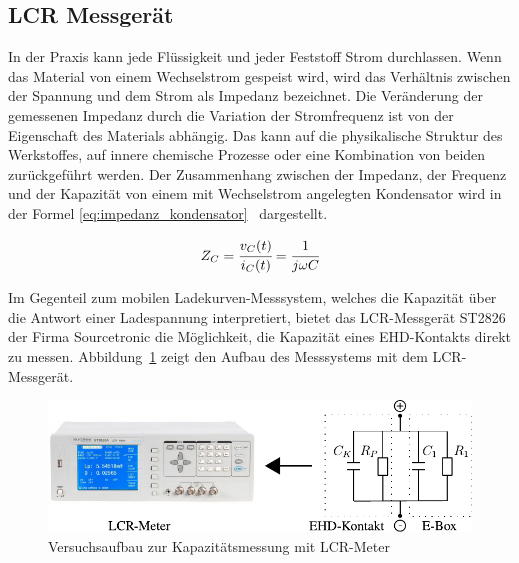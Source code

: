 \subsection{LCR Messgerät}
\label{sub:lcr_messgeraet}

In der Praxis kann jede Flüssigkeit und jeder Feststoff Strom durchlassen.
Wenn das Material von einem Wechselstrom gespeist wird, wird das Verhältnis zwischen der Spannung und dem Strom als Impedanz bezeichnet.
Die Veränderung der gemessenen Impedanz durch die Variation der Stromfrequenz ist von der Eigenschaft des Materials abhängig.
Das kann auf die physikalische Struktur des Werkstoffes, auf innere chemische Prozesse oder eine Kombination von beiden zurückgeführt werden.
Der Zusammenhang zwischen der Impedanz, der Frequenz und der Kapazität von einem mit Wechselstrom angelegten Kondensator wird in der Formel \ref{eq:impedanz_kondensator}~\cite{impedance} dargestellt.

\begin{equation}
    Z_{C} = \cfrac{v_C(t)}{i_C(t)} = \cfrac{1}{j \omega C}
    \label{eq:impedanz_kondensator}
\end{equation}

Im Gegenteil zum mobilen Ladekurven-Messsystem, welches die Kapazität über die Antwort einer Ladespannung interpretiert, bietet das LCR-Messgerät ST2826 der Firma Sourcetronic die Möglichkeit, die Kapazität eines EHD-Kontakts direkt zu messen.
Abbildung~\ref{fig:versuchsaufbau_zur_kapazitaetsmessung_mit_lcr_meter} zeigt den Aufbau des Messsystems mit dem LCR-Messgerät.

\begin{figure}[htb]
    \centering
    \includegraphics[]{./images/versuchsaufbau_mit_lcr_meter.pdf}
    \caption{Versuchsaufbau zur Kapazitätsmessung mit LCR-Meter}
    \label{fig:versuchsaufbau_zur_kapazitaetsmessung_mit_lcr_meter}
\end{figure}

